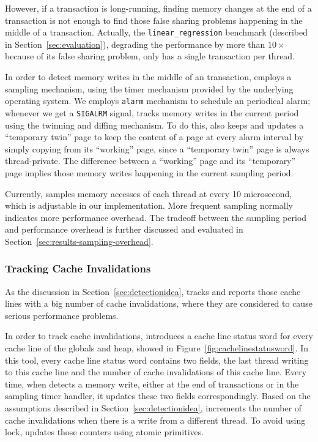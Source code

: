 However, if a transaction is long-running, finding memory changes at the end of a transaction is not enough to find those false sharing problems happening in the middle of a transaction. Actually, the \texttt{linear\_regression} benchmark (described in Section~\ref{sec:evaluation}), degrading the performance by more than $10\times$ because of its false sharing problem, only has a single transaction per thread. 

In order to detect memory writes in the middle of an transaction, \SheriffDetect{} employs a sampling mechanism, using the timer mechanism provided by the underlying operating system. We employs \texttt{alarm} mechanism to schedule an periodical alarm; whenever we get a \texttt{SIGALRM} signal, \SheriffDetect{} tracks memory writes in the current period using the twinning and diffing mechanism. To do this, \SheriffDetect{} also keeps and updates a ``temporary twin'' page to keep the content of a page at every alarm interval by simply copying from its ``working'' page, since a ``temporary twin'' page is always thread-private. The difference between a ``working'' page and its ``temporary'' page implies those memory writes happening in the current sampling period. 

Currently, \SheriffDetect{} samples memory accesses of each thread at every 10 microsecond, which is  adjustable in our implementation. More frequent sampling normally indicates more performance overhead. The tradeoff between the sampling period and performance overhead is further discussed and evaluated in Section~\ref{sec:results-sampling-overhead}. 

\subsubsection{Tracking Cache Invalidations}
\label{sec:invalidation}
As the discussion in Section~\ref{sec:detectionidea}, \SheriffDetect{} tracks and reports those cache lines with a big number of cache invalidations, where they are considered to cause serious performance problems. 

In order to track cache invalidations, \SheriffDetect{} introduces a cache line status word for every cache line of the globals and heap, showed in Figure~\ref{fig:cachelinestatusword}.  In this tool, every cache line status word contains two fields, the last thread writing to this cache line and the number of cache invalidations of this cache line. 
Every time, when \SheriffDetect{} detects a memory write, either at the end of transactions or in the sampling timer handler, it updates these two fields correspondingly. Based on the assumptions described in Section~\ref{sec:detectionidea}, \SheriffDetect{} increments the number of cache invalidations when there is a write from a different thread. To avoid using lock, \SheriffDetect{} updates those counters using atomic primitives. 

